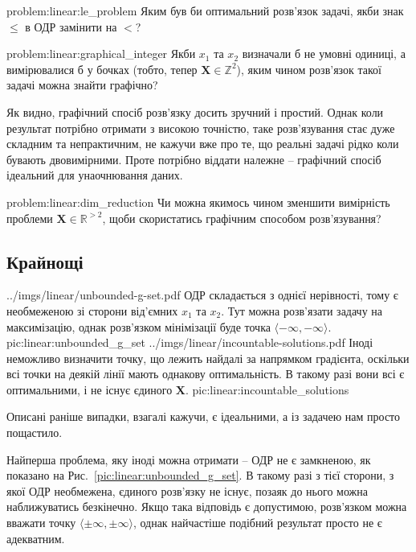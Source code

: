 \documentclass[\main/book.tex]{subfiles}
\begin{document}
\begin{problem}{problem:linear:le_problem}
 Яким був би оптимальний розв'язок задачі, якби знак \flqq{}$\leq$\frqq{} в ОДР замінити на \flqq$<$\frqq?
\end{problem}

\begin{problem}{problem:linear:graphical_integer}
 Якби $x_1$ та $x_2$ визначали б не умовні одиниці, а вимірювалися б у бочках (тобто, тепер $\mathbf{X} \in \mathbb{Z}^2$), яким чином розв'язок такої задачі можна знайти графічно?
\end{problem}

Як видно, графічний спосіб розв'язку досить зручний і простий. Однак коли результат потрібно отримати з високою точністю, таке роз\-в'я\-зу\-ван\-ня стає дуже складним та непрактичним, не кажучи вже про те, що реальні задачі рідко коли бувають двовимірними. Проте потрібно віддати належне -- графічний спосіб ідеальний для унаочнювання даних.

\begin{problem}{problem:linear:dim_reduction}
 Чи можна якимось чином зменшити вимірність проблеми ${\mathbf{X} \in \mathbb{R}^{> 2}}$, щоби скористатись графічним способом розв'язування?
\end{problem}


\subsection{Крайнощі}

\twocolminipage
 {
  \nofigillustration
   {../imgs/linear/unbounded-g-set.pdf}
   {ОДР складається з однієї нерівності, тому є необмеженою зі сторони від'ємних $x_1$ та $x_2$. Тут можна розв'язати задачу на максимізацію, однак розв'язком мінімізації буде точка ${\langle -\infty, -\infty \rangle}$.}
   {pic:linear:unbounded_g_set}
 }{
  \nofigillustration
   {../imgs/linear/incountable-solutions.pdf}
   {Іноді неможливо визначити точку, що лежить найдалі за напрямком градієнта, оскільки всі точки на деякій лінії мають однакову оптимальність. В такому разі вони всі є оптимальними, і не існує єдиного $\mathbf{X}$.}
   {pic:linear:incountable_solutions}
 }

Описані раніше випадки, взагалі кажучи, є ідеальними, а із задачею нам просто пощастило.

Найперша проблема, яку іноді можна отримати -- ОДР не є замкненою, як показано на Рис.~\ref{pic:linear:unbounded_g_set}. В такому разі з тієї сторони, з якої ОДР необмежена, єдиного розв'язку не існує, позаяк до нього можна наближуватись безкінечно. Якщо така відповідь є допустимою, розв'язком можна вважати точку ${\langle \pm \infty, \pm \infty \rangle}$, однак найчастіше подібний результат просто не є адекватним.
\end{document}
